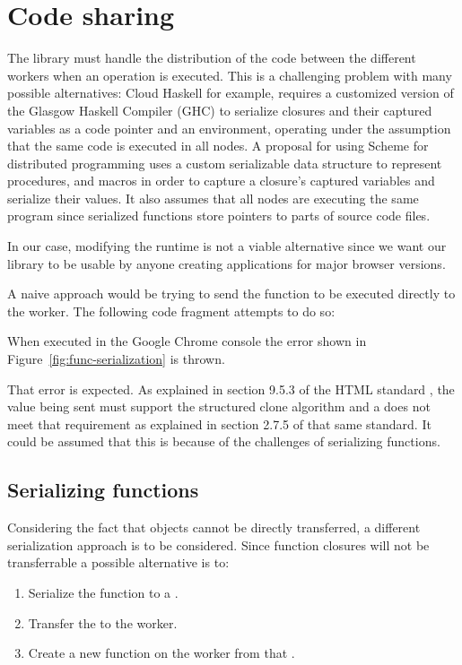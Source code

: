 \section{Code sharing}\label{sec:code-sharing}
The library must handle the distribution of the code between the different workers when an operation is executed. This is a challenging problem with many possible alternatives: Cloud Haskell \cite{cloud-haskell} for example, requires a customized version of the Glasgow Haskell Compiler (GHC) to serialize closures and their captured variables as a code pointer and an environment, operating under the assumption that the same code is executed in all nodes. A proposal for using Scheme for distributed programming \cite{distributed-scheme} uses a custom serializable data structure to represent procedures, and macros in order to capture a closure's captured variables and serialize their values. It also assumes that all nodes are executing the same program since serialized functions store pointers to parts of source code files.

In our case, modifying the runtime is not a viable alternative since we want our library to be usable by anyone creating applications for major browser versions.

A naive approach would be trying to send the function to be executed directly to the worker. The following code fragment attempts to do so:


When executed in the Google Chrome console the error shown in Figure~\ref{fig:func-serialization} is thrown.

That error is expected. As explained in section 9.5.3 of the HTML standard \cite{html-whatwg}, the value being sent must support the structured clone algorithm and a  does not meet that requirement as explained in section 2.7.5 of that same standard. It could be assumed that this is because of the challenges of serializing functions.

\subsection{Serializing functions}
Considering the fact that \tfunction{} objects cannot be directly transferred, a different serialization approach is to be considered. Since function closures will not be transferrable a possible alternative is to:
\begin{enumerate}
  \item Serialize the function to a \tstring{}.
  \item Transfer the \tstring{} to the worker.
  \item Create a new function on the worker from that \tstring{}.
\end{enumerate}

